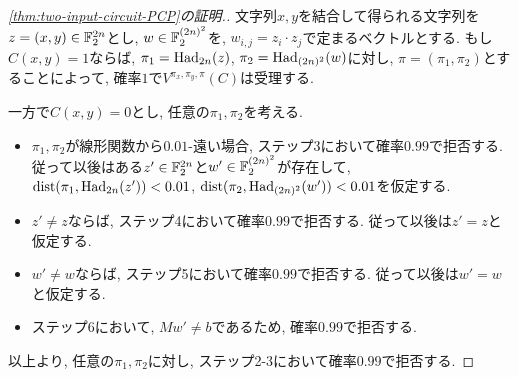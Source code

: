\begin{proof}[\cref{thm:two-input-circuit-PCP}の証明.]
文字列$x,y$を結合して得られる文字列を$z=(x,y)\in\mathbb{F}_2^{2n}$とし,
$w\in\mathbb{F}_2^{(2n)^2}$を, $w_{i,j} = z_i\cdot z_j$で定まるベクトルとする.
もし$C(x,y)=1$ならば, $\pi_1 = \mathrm{Had}_{2n}(z)$, $\pi_2 = \mathrm{Had}_{(2n)^2}(w)$に対し, $\pi=(\pi_1,\pi_2)$とすることによって, 確率$1$で$V^{\pi_x,\pi_{y},\pi}(C)$は受理する.

一方で$C(x,y)=0$とし, 任意の$\pi_1,\pi_2$を考える.
\begin{itemize}
  \item $\pi_1,\pi_2$が線形関数から$0.01$-遠い場合, ステップ3において確率$0.99$で拒否する. 従って以後はある$z'\in\mathbb{F}_2^{2n}$と$w'\in\mathbb{F}_2^{(2n)^2}$が存在して, $\mathrm{dist}(\pi_1, \mathrm{Had}_{2n}(z'))<0.01$, $\mathrm{dist}(\pi_2, \mathrm{Had}_{(2n)^2}(w'))<0.01$を仮定する.
  \item $z'\ne z$ならば, ステップ4において確率$0.99$で拒否する. 従って以後は$z'=z$と仮定する.
  \item $w'\ne w$ならば, ステップ5において確率$0.99$で拒否する. 従って以後は$w'=w$と仮定する.
  \item ステップ6において, $Mw'\ne b$であるため, 確率$0.99$で拒否する.
\end{itemize}
以上より, 任意の$\pi_1,\pi_2$に対し, ステップ2-3において確率$0.99$で拒否する.
\end{proof}